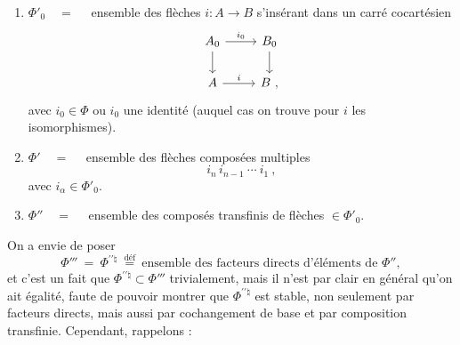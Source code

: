 \newpage


\begin{enumerate}[leftmargin=*]
\item[1)] $\Phi'_0 \quad = \quad$ ensemble des flèches $i : A \longrightarrow B$ s'insérant dans un carré cocartésien
\[
\begin{tikzcd}
A_0 \arrow[r, "i_0"] \arrow[d] & B_0 \arrow[d]\\
A \arrow[r, "i"] & B\ ,
\end{tikzcd}
\]
avec $i_0 \in \Phi$ ou $i_0$ une identité (auquel cas on trouve pour $i$ les isomorphismes).

\item[2)] $\Phi' \quad = \quad$ ensemble des flèches composées multiples
\[
i_n \, i_{n-1} \ \cdots \ i_1\ ,
\]
avec $i_\alpha \in \Phi'_0$.

\item[3)] $\Phi'' \quad = \quad$ ensemble des composés transfinis de flèches $\in \Phi'_0$.
\end{enumerate}

On a envie de poser
\[
\Phi''' \ = \ \Phi^{\prime\prime\natural} \ \overset{\text{déf}}{=} \ \text{ensemble des facteurs directs d'éléments de } \Phi'',
\]
et c'est un fait que $\Phi^{\prime\prime\natural} \subset \Phi'''$ trivialement, mais il n'est par clair en général qu'on ait %
égalité, faute de pouvoir montrer que $\Phi^{\prime\prime\natural}$ est stable, non seulement par facteurs directs, mais aussi par cochangement de base et par composition transfinie. Cependant, rappelons :

